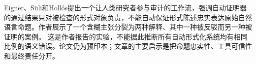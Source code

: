 \documentclass[10pt]{article}
\begin{document}
\begin{documents}
{Eigner、Süli和Hollós提出一个让人类研究者参与审计的工作流，强调自动证明器的通过结果只对被检查的形式对象负责，不能自动保证形式陈述忠实表达原始自然语言命题。作者展示了一个含糊主张分裂为两种解释、其中一种被反驳而另一种被证明的案例。\cite{audit} 这是作者报告的实验，不能据此推断所有自动形式化系统均有相同比例的语义错误。论文仍为预印本；文章的主要启示是把命题忠实性、工具可信性和最终责任分开。
}
\end{documents}


\end{document}
